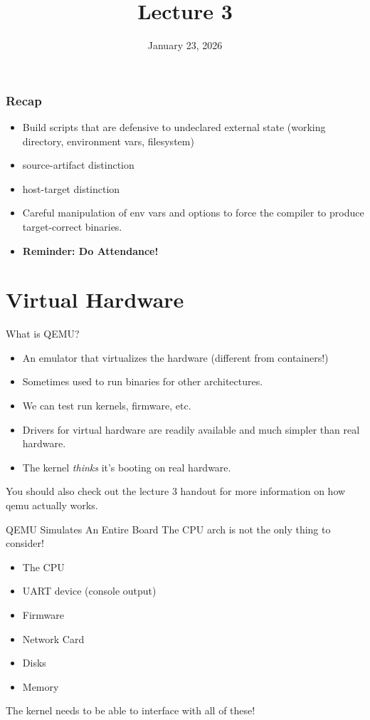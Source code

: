 \documentclass{../lecture}
\title{Lecture 3}
\date{January 23, 2026}
\begin{document}
\maketitle

\begin{frame}[t]
  \frametitle{Recap}
  \begin{itemize}
    \item Build scripts that are defensive to undeclared external state (working
      directory, environment vars, filesystem)
    \item source-artifact distinction
    \item host-target distinction
    \item Careful manipulation of env vars and options to force the compiler to
    produce target-correct binaries.
    \item \textbf{Reminder: Do Attendance!}
  \end{itemize}
\end{frame}

\section{Virtual Hardware}

\begin{frame}{What is QEMU?}
  \begin{itemize}
    \item An emulator that virtualizes the hardware (different from containers!)
    \item Sometimes used to run binaries for other architectures.
    \item We can test run kernels, firmware, etc.
    \item Drivers for virtual hardware are readily available and much simpler
      than real hardware.
    \item The kernel \textit{thinks} it's booting on real hardware.
  \end{itemize}
  You should also check out the lecture 3 handout for more information on how
  qemu actually works.
\end{frame}

\begin{frame}{QEMU Simulates An Entire Board}
  The CPU arch is not the only thing to consider!
  \begin{itemize}
    \item The CPU
    \item UART device (console output)
    \item Firmware
    \item Network Card
    \item Disks
    \item Memory
  \end{itemize}
  The kernel needs to be able to interface with all of these!
\end{frame}
\end{document}
